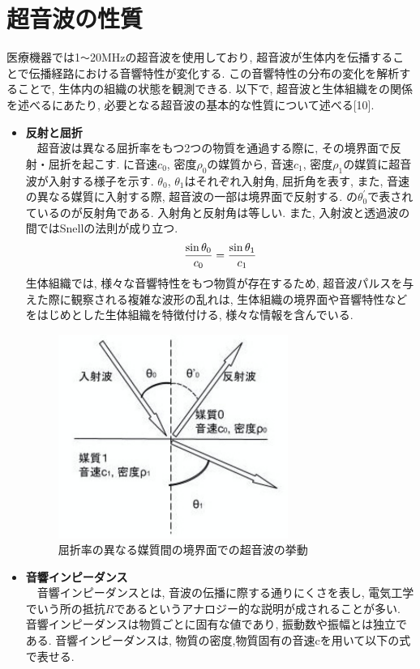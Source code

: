 \section{超音波の性質}
医療機器では1\verb|〜|20MHzの超音波を使用しており, 超音波が生体内を伝播することで伝播経路における音響特性が変化する. この音響特性の分布の変化を解析することで, 生体内の組織の状態を観測できる. 以下で, 超音波と生体組織をの関係を述べるにあたり, 必要となる超音波の基本的な性質について述べる[10].
\begin{itemize}
\item{\bf 反射と屈折}
\\\ \ 超音波は異なる屈折率をもつ2つの物質を通過する際に, その境界面で反射・屈折を起こす.  に音速$c_0$, 密度$\rho_0$の媒質から, 音速$c_1$, 密度$\rho_1$の媒質に超音波が入射する様子を示す. $\theta_0$, $\theta_1$はそれぞれ入射角, 屈折角を表す, また, 音速の異なる媒質に入射する際, 超音波の一部は境界面で反射する. の$\theta_0^{\prime}$で表されているのが反射角である. 入射角と反射角は等しい. また, 入射波と透過波の間ではSnellの法則が成り立つ.
\begin{equation}
\\ \dfrac{\sin\theta_0}{c_0} = \dfrac{\sin\theta_1}{c_1}
\end{equation}
生体組織では, 様々な音響特性をもつ物質が存在するため, 超音波パルスを与えた際に観察される複雑な波形の乱れは, 生体組織の境界面や音響特性などをはじめとした生体組織を特徴付ける, 様々な情報を含んでいる. 
\begin{figure}[H]
  \begin{center}
    \includegraphics[width=75mm]{fig/hansha.pdf}
  \end{center}
  \caption{屈折率の異なる媒質間の境界面での超音波の挙動}
\end{figure}
\item{\bf 音響インピーダンス}
\\\ \ 音響インピーダンスとは, 音波の伝播に際する通りにくさを表し, 電気工学でいう所の抵抗$R$であるというアナロジー的な説明が成されることが多い. 音響インピーダンスは物質ごとに固有な値であり, 振動数や振幅とは独立である. 音響インピーダンスは, 物質の密度,物質固有の音速cを用いて以下の式で表せる.

\end{itemize}
